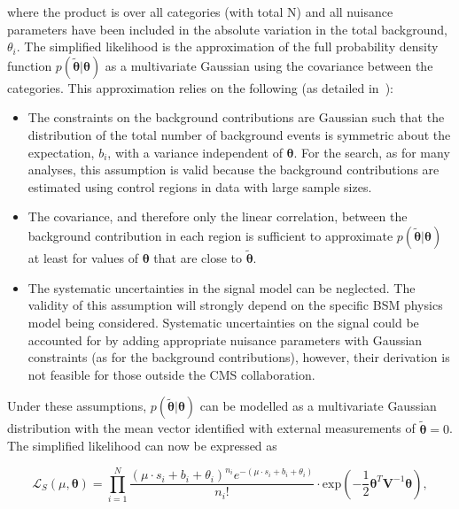 where the product is over all categories (with total N) and all nuisance parameters
have been included in the absolute variation in the total background, $\theta_i$. The simplified likelihood 
is the approximation of the full probability density function $p(\tilde{\boldsymbol{\theta}}|\boldsymbol{\theta})$
as a multivariate Gaussian using the covariance between the categories. This approximation relies 
on the following (as detailed in~\cite{simp-lik}):
\begin{itemize}
\item{The constraints on the background contributions are Gaussian such that the distribution of 
the total number of background events is symmetric about the expectation, $b_{i}$, 
with a variance independent of $\boldsymbol{\theta}$. For the \alphat search, as for many analyses, 
this assumption is valid because the background contributions are estimated using control regions in 
data with large sample sizes.}

\item{The covariance, and therefore only the linear correlation, 
between the background contribution in each region is sufficient 
to approximate $p(\tilde{\boldsymbol{\theta}}|\boldsymbol{\theta})$ 
at least for values of $\boldsymbol{\theta}$ that are close to $\tilde{\boldsymbol{\theta}}$.}

\item{The systematic uncertainties in the signal model can be neglected. The validity of 
this assumption will strongly depend on the specific BSM physics model being considered. 
Systematic uncertainties on the signal could be accounted for by adding appropriate 
nuisance parameters with Gaussian constraints (as for the background contributions), however,
their derivation is not feasible for those outside the CMS collaboration.} 
\end{itemize}

Under these assumptions, $p(\tilde{\boldsymbol{\theta}}|\boldsymbol{\theta})$ can be modelled as a multivariate 
Gaussian distribution with the mean vector identified with external measurements of 
$\tilde{\boldsymbol{\theta}}=0$. The simplified likelihood can now be expressed as

\begin{equation}
\mathcal{L}_{S}(\mu, \boldsymbol{\theta}) =  \prod_{i=1}^{N} \dfrac{(\mu \cdot s_{i}+b_{i}+\theta_{i})^{n_{i}} e^{-(\mu \cdot s_{i}+b_{i}+\theta_{i})} }{n_{i}!} \cdot  
\mathrm{exp}\left(-\dfrac{1}{2} \boldsymbol{\theta}^{T}\mathrm{\mathbf{V}}^{-1}\boldsymbol{\theta} \right),
\label{eq:full-likelihood}
\end{equation}

